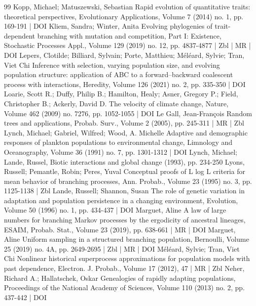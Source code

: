 \documentclass[10pt]{amsart}
\theoremstyle{definition}\newtheorem{defi}[theo]{Definition}\newtheorem{rema}[theo]{Remark}\newtheorem{exam}[theo]{Example}\newtheorem{exem}[theo]{Example}\newtheorem{nota}[theo]{Notation}
\begin{document}
\begin{thebibliography}{99}
Kopp, Michael; Matuszewski, Sebastian Rapid evolution of quantitative traits: theoretical perspectives, Evolutionary Applications, Volume 7 (2014) no. 1, pp. 169-191 | DOI
Kliem, Sandra; Winter, Anita Evolving phylogenies of trait-dependent branching with mutation and competition, Part I: Existence, Stochastic Processes Appl., Volume 129 (2019) no. 12, pp. 4837-4877 | Zbl | MR | DOI
Lepers, Clotilde; Billiard, Sylvain; Porte, Matthieu; Méléard, Sylvie; Tran, Viet Chi Inference with selection, varying population size, and evolving population structure: application of ABC to a forward–backward coalescent process with interactions, Heredity, Volume 126 (2021) no. 2, pp. 335-350 | DOI
Loarie, Scott R.; Duffy, Philip B.; Hamilton, Healy; Asner, Gregory P.; Field, Christopher B.; Ackerly, David D. The velocity of climate change, Nature, Volume 462 (2009) no. 7276, pp. 1052-1055 | DOI
Le Gall, Jean-François Random trees and applications, Probab. Surv., Volume 2 (2005), pp. 245-311 | MR | Zbl
Lynch, Michael; Gabriel, Wilfred; Wood, A. Michelle Adaptive and demographic responses of plankton populations to environmental change, Limnology and Oceanography, Volume 36 (1991) no. 7, pp. 1301-1312 | DOI
Lynch, Michael; Lande, Russel, Biotic interactions and global change (1993), pp. 234-250
Lyons, Russell; Pemantle, Robin; Peres, Yuval Conceptual proofs of L log L criteria for mean behavior of branching processes, Ann. Probab., Volume 23 (1995) no. 3, pp. 1125-1138 | Zbl
Lande, Russell; Shannon, Susan The role of genetic variation in adaptation and population persistence in a changing environment, Evolution, Volume 50 (1996) no. 1, pp. 434-437 | DOI
Marguet, Aline A law of large numbers for branching Markov processes by the ergodicity of ancestral lineages, ESAIM, Probab. Stat., Volume 23 (2019), pp. 638-661 | MR | DOI
Marguet, Aline Uniform sampling in a structured branching population, Bernoulli, Volume 25 (2019) no. 4A, pp. 2649-2695 | Zbl | MR | DOI
Méléard, Sylvie; Tran, Viet Chi Nonlinear historical superprocess approximations for population models with past dependence, Electron. J. Probab., Volume 17 (2012), 47 | MR | Zbl
Neher, Richard A.; Hallatschek, Oskar Genealogies of rapidly adapting populations, Proceedings of the National Academy of Sciences, Volume 110 (2013) no. 2, pp. 437-442 | DOI

\end{thebibliography}
\end{document}
